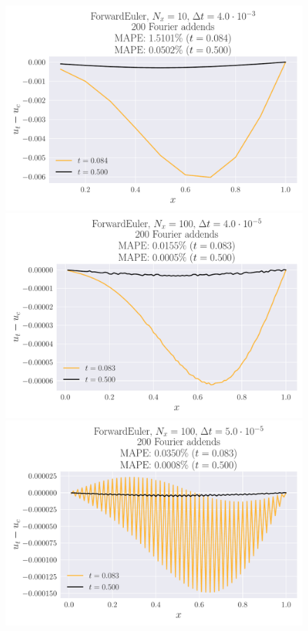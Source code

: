 \documentclass[reprint, english,notitlepage,nofootinbib]{revtex4-1}  %
\begin{document}
\begin{figure}
  \includegraphics[width=\linewidth]{ForwardEuler-Nt125-dt4_0e-03-Nx10-Error.pdf}
  \includegraphics[width=\linewidth]{ForwardEuler-Nt12499-dt4_0e-05-Nx100-Error.pdf}
  \includegraphics[width=\linewidth]{ForwardEuler-Nt10000-dt5_0e-05-Nx100-Error.pdf}

\end{figure}
\end{document}
